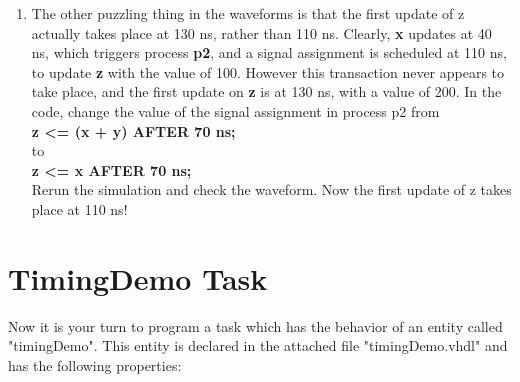 \documentclass[a4paper,12pt]{article}
\newcommand\tab[1][1cm]{\hspace*{ #1} }
\begin{document}
\begin{enumerate}
\item %
The other puzzling thing in the waveforms is that the first update of z actually takes place at 130 ns, rather than 110 ns. Clearly, \textbf{x} updates at 40 ns, which triggers process \textbf{p2}, and a signal assignment is scheduled at 110 ns, to update \textbf{z} with the value of 100. However this transaction never appears to take place, and the first update on \textbf{z} is at 130 ns, with a value of 200.
In the code, change the value of the signal assignment in process p2 from
\\
\tab \textbf{z \textless= (x + y) AFTER 70 ns;}
\\
to
\\
\tab \textbf{z \textless= x AFTER 70 ns;}
\\
Rerun the simulation and check the waveform. Now the first update of z takes place at 110 ns!
\\
\end{enumerate}



\section*{TimingDemo Task}

Now it is your turn to program a task which has the behavior of an entity called "timingDemo". This entity is declared in the attached file "timingDemo.vhdl" and has the following properties:
\end{document}
